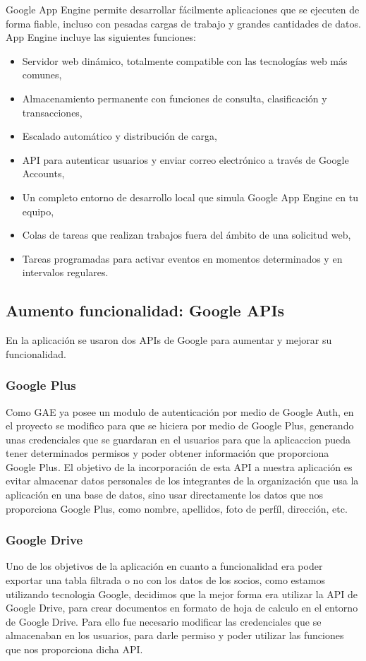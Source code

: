 Google App Engine permite desarrollar fácilmente aplicaciones que se ejecuten de forma fiable, 
incluso con pesadas cargas de trabajo y grandes cantidades de datos. App Engine incluye las siguientes funciones:

\begin{itemize}
  \item Servidor web dinámico, totalmente compatible con las tecnologías web más comunes,
  \item Almacenamiento permanente con funciones de consulta, clasificación y transacciones,
  \item Escalado automático y distribución de carga,
  \item API para autenticar usuarios y enviar correo electrónico a través de Google Accounts,
  \item Un completo entorno de desarrollo local que simula Google App Engine en tu equipo,
  \item Colas de tareas que realizan trabajos fuera del ámbito de una solicitud web,
  \item Tareas programadas para activar eventos en momentos determinados y en intervalos regulares.
\end{itemize}

\subsection{Aumento funcionalidad: Google APIs}


En la aplicación se usaron dos APIs de Google para aumentar y mejorar su funcionalidad. 


\subsubsection{Google Plus}
Como GAE ya posee un modulo de autenticación por medio de Google Auth,
en el proyecto se modifico para que se hiciera por medio de Google Plus, generando unas credenciales que se guardaran en el usuarios
para que la aplicaccion pueda tener determinados permisos y poder obtener información que proporciona Google Plus. El objetivo de la incorporación de esta 
API a nuestra aplicación es evitar almacenar datos personales de los integrantes de la organización que usa la aplicación en una base de datos, sino usar directamente los
datos que nos proporciona Google Plus, como nombre, apellidos, foto de perfíl, dirección, etc.

\subsubsection{Google Drive}
Uno de los objetivos de la aplicación en cuanto a funcionalidad era poder exportar una tabla filtrada o no con los datos de los socios, como estamos utilizando tecnologia Google,
decidimos que la mejor forma era utilizar la API de Google Drive, para crear documentos en formato de hoja de calculo en el entorno de Google Drive. Para ello fue necesario
modificar las credenciales que se almacenaban en los usuarios, para darle permiso y poder utilizar las funciones que nos proporciona dicha API.

